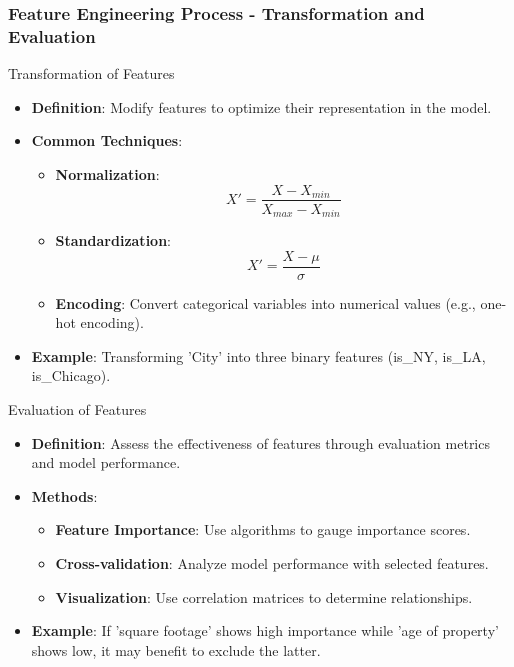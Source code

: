 \documentclass[aspectratio=169]{beamer}
\begin{document}
\begin{frame}[fragile]
    \frametitle{Feature Engineering Process - Transformation and Evaluation}
    \begin{block}{Transformation of Features}
        \begin{itemize}
            \item \textbf{Definition}: Modify features to optimize their representation in the model.
            \item \textbf{Common Techniques}:
            \begin{itemize}
                \item \textbf{Normalization}:
                \[
                X' = \frac{X - X_{min}}{X_{max} - X_{min}}
                \]
                \item \textbf{Standardization}:
                \[
                X' = \frac{X - \mu}{\sigma}
                \]
                \item \textbf{Encoding}: Convert categorical variables into numerical values (e.g., one-hot encoding).
            \end{itemize}
            \item \textbf{Example}: Transforming 'City' into three binary features (is\_NY, is\_LA, is\_Chicago).
        \end{itemize}
    \end{block}

    \begin{block}{Evaluation of Features}
        \begin{itemize}
            \item \textbf{Definition}: Assess the effectiveness of features through evaluation metrics and model performance.
            \item \textbf{Methods}:
            \begin{itemize}
                \item \textbf{Feature Importance}: Use algorithms to gauge importance scores.
                \item \textbf{Cross-validation}: Analyze model performance with selected features.
                \item \textbf{Visualization}: Use correlation matrices to determine relationships.
            \end{itemize}
            \item \textbf{Example}: If 'square footage' shows high importance while 'age of property' shows low, it may benefit to exclude the latter.
        \end{itemize}
    \end{block}
\end{frame}
\end{document}
